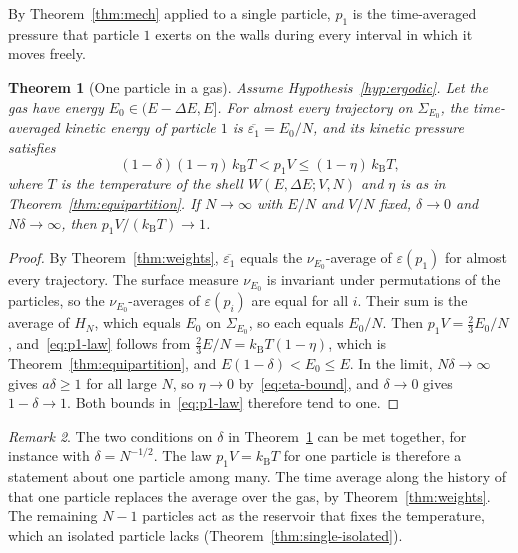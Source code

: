 \documentclass[11pt,a4paper]{article}
\newtheorem{theorem}{Theorem}[section]
\theoremstyle{definition}
\theoremstyle{remark}
\newtheorem{remark}[theorem]{Remark}
\newcommand{\kB}{k_{\mathrm{B}}}
\begin{document}
By Theorem~\ref{thm:mech} applied to a single particle, $p_1$ is the time-averaged pressure that particle $1$ exerts on the walls during every interval in which it moves freely.

\begin{theorem}[One particle in a gas]
\label{thm:single-gas}
Assume Hypothesis~\ref{hyp:ergodic}.
Let the gas have energy $E_0\in(E-\Delta E,E]$.
For almost every trajectory on $\Sigma_{E_0}$, the time-averaged kinetic energy of particle $1$ is $\overline{\varepsilon_1}=E_0/N$, and its kinetic pressure satisfies
\begin{equation}
(1-\delta)(1-\eta)\,\kB T<p_1V\le(1-\eta)\,\kB T,
\label{eq:p1-law}
\end{equation}
where $T$ is the temperature of the shell $W(E,\Delta E;V,N)$ and $\eta$ is as in Theorem~\ref{thm:equipartition}.
If $N\to\infty$ with $E/N$ and $V/N$ fixed, $\delta\to0$ and $N\delta\to\infty$, then $p_1V/(\kB T)\to1$.
\end{theorem}

\begin{proof}
By Theorem~\ref{thm:weights}, $\overline{\varepsilon_1}$ equals the $\nu_{E_0}$-average of $\varepsilon(p_1)$ for almost every trajectory.
The surface measure $\nu_{E_0}$ is invariant under permutations of the particles, so the $\nu_{E_0}$-averages of $\varepsilon(p_i)$ are equal for all $i$.
Their sum is the average of $H_N$, which equals $E_0$ on $\Sigma_{E_0}$, so each equals $E_0/N$.
Then $p_1V=\tfrac23E_0/N$, and~\eqref{eq:p1-law} follows from $\tfrac23E/N=\kB T(1-\eta)$, which is Theorem~\ref{thm:equipartition}, and $E(1-\delta)<E_0\le E$.
In the limit, $N\delta\to\infty$ gives $a\delta\ge1$ for all large $N$, so $\eta\to0$ by~\eqref{eq:eta-bound}, and $\delta\to0$ gives $1-\delta\to1$.
Both bounds in~\eqref{eq:p1-law} therefore tend to one.
\end{proof}

\begin{remark}
\label{rem:single}
The two conditions on $\delta$ in Theorem~\ref{thm:single-gas} can be met together, for instance with $\delta=N^{-1/2}$.
The law $p_1V=\kB T$ for one particle is therefore a statement about one particle among many.
The time average along the history of that one particle replaces the average over the gas, by Theorem~\ref{thm:weights}.
The remaining $N-1$ particles act as the reservoir that fixes the temperature, which an isolated particle lacks (Theorem~\ref{thm:single-isolated}).
\end{remark}
\end{document}

